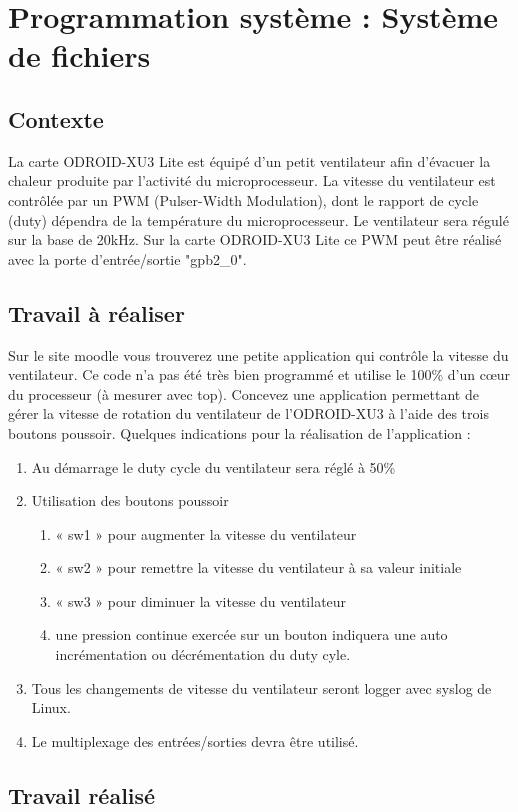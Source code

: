 \newpage
\section{Programmation système : Système de fichiers}
\subsection{Contexte}
La	carte ODROID-XU3	Lite	est	équipé	d’un	petit	ventilateur	afin	d’évacuer	la	chaleur	produite	par	
l’activité	du	microprocesseur.	La	vitesse	du	ventilateur	est	contrôlée par	un	PWM	(Pulser-Width	
Modulation),	dont	le	rapport	de	cycle	(duty)	dépendra	de	la	température	du	microprocesseur.	Le	
ventilateur	sera	régulé	sur	la	base	de	20kHz.		Sur	la	carte	ODROID-XU3	Lite	ce	PWM	peut	être	réalisé	
avec	la	porte	d’entrée/sortie	"gpb2\_0".
\subsection{Travail à réaliser}
Sur	le	site	moodle	vous	trouverez	une	petite	application	qui	contrôle	la	vitesse	du	ventilateur.	Ce	code	
n’a	pas	été	très	bien	programmé	et	utilise	le	100\%	d’un	cœur	du	processeur	(à	mesurer	avec	top).	
Concevez	une	application	permettant	de	gérer	la	vitesse	de	rotation	du	ventilateur	de	l’ODROID-XU3	
à	l’aide	des	trois	boutons	poussoir.
Quelques	indications	pour	la	réalisation de	l’application :
\begin{enumerate}
\item Au	démarrage	le	duty	cycle	du	ventilateur	sera	réglé	à	50\%
\item Utilisation	des	boutons	poussoir
\begin{enumerate}
\item « sw1 »	pour	augmenter	la	vitesse	du	ventilateur
\item « sw2 »	pour	remettre	la	vitesse	du	ventilateur	à	sa	valeur	initiale
\item « sw3 »	pour	diminuer	la	vitesse	du	ventilateur
\item une	pression	continue	exercée	sur	un	bouton	indiquera	une	auto	incrémentation	
ou	décrémentation	du	duty	cyle.
\end{enumerate}
\item Tous	les	changements	de	vitesse	du	ventilateur	seront	logger	avec	syslog	de	Linux.
\item Le	multiplexage	des	entrées/sorties	devra	être	utilisé.
\end{enumerate}

\subsection{Travail réalisé}
